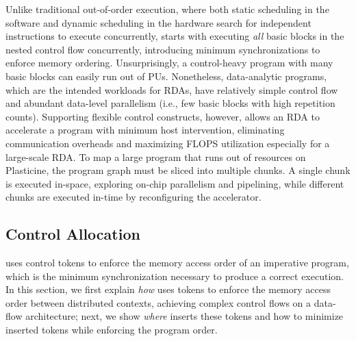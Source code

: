 Unlike traditional out-of-order execution, where both static scheduling in the software and dynamic
scheduling in the hardware search for independent instructions to execute concurrently, 
\name starts with executing \emph{all} basic blocks in the nested control flow concurrently,
introducing minimum synchronizations to enforce memory ordering.
Unsurprisingly, a control-heavy program with many basic blocks can easily run out of PUs.
Nonetheless, data-analytic programs, which are the intended workloads for RDAs, have relatively
simple control flow and abundant data-level parallelism (i.e., few basic blocks with high repetition
counts).
Supporting flexible control constructs, however, allows an RDA to accelerate a program with
minimum host intervention, eliminating communication overheads and maximizing FLOPS utilization especially for a
large-scale RDA.
To map a large program that runs out of resources on Plasticine, the program graph must be sliced into multiple chunks.
A single chunk is executed in-space, exploring on-chip parallelism and pipelining,
while different chunks are executed in-time by reconfiguring the accelerator.

\subsection{Control Allocation} \label{sec:controlalloc}
\label{sec:sync}
\name uses control tokens to enforce the memory access order of an imperative program, 
which is the minimum synchronization necessary to produce a correct execution.
In this section, we first explain \emph{how} \name uses tokens to enforce the memory access 
order between distributed contexts, achieving complex control flows on a data-flow architecture;
next, we show \emph{where} \name inserts these tokens and how to minimize inserted tokens while
enforcing the program order.


